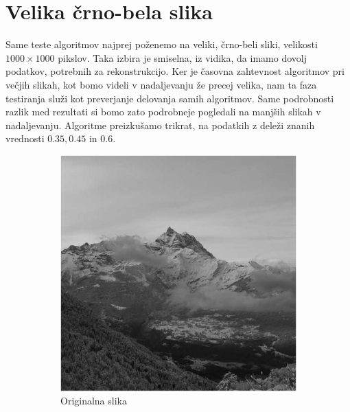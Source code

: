 \section{Velika črno-bela slika}
Same teste algoritmov najprej poženemo na veliki, črno-beli sliki, velikosti $1000\times1000$ pikslov. Taka izbira je smiselna, iz vidika, da imamo dovolj podatkov, potrebnih za rekonstrukcijo. Ker je časovna zahtevnost algoritmov pri večjih slikah, kot bomo videli v nadaljevanju že precej velika, nam ta faza testiranja služi kot preverjanje delovanja samih algoritmov. Same podrobnosti razlik med rezultati si bomo zato podrobneje pogledali na manjših slikah v nadaljevanju. Algoritme preizkušamo trikrat, na podatkih z deleži znanih vrednosti $0.35, 0.45$ in $0.6$.
\begin{figure}[h]
    \centering
    \begin{subfigure}{0.49\linewidth}
        \includegraphics[width=\linewidth]{Poglavja/Slike/grayscale1000/slikaInput.png}
        \caption{Originalna slika}
    \end{subfigure}
    \hfill
    \begin{subfigure}{0.49\linewidth}

\end{subfigure}
\end{figure}
